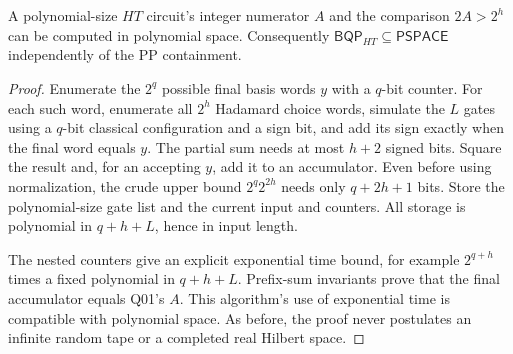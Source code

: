 \begin{theorem}\label{thm:Q04}
A polynomial-size $HT$ circuit's integer numerator $A$ and the comparison $2A>2^h$ can be computed in polynomial space. Consequently $\mathsf{BQP}_{HT}\subseteq\mathsf{PSPACE}$ independently of the PP containment.
\end{theorem}
\begin{proof}
Enumerate the $2^q$ possible final basis words $y$ with a $q$-bit counter. For each such word, enumerate all $2^h$ Hadamard choice words, simulate the $L$ gates using a $q$-bit classical configuration and a sign bit, and add its sign exactly when the final word equals $y$. The partial sum needs at most $h+2$ signed bits. Square the result and, for an accepting $y$, add it to an accumulator. Even before using normalization, the crude upper bound $2^q 2^{2h}$ needs only $q+2h+1$ bits. Store the polynomial-size gate list and the current input and counters. All storage is polynomial in $q+h+L$, hence in input length.

The nested counters give an explicit exponential time bound, for example $2^{q+h}$ times a fixed polynomial in $q+h+L$. Prefix-sum invariants prove that the final accumulator equals Q01's $A$. This algorithm's use of exponential time is compatible with polynomial space. As before, the proof never postulates an infinite random tape or a completed real Hilbert space.
\end{proof}
